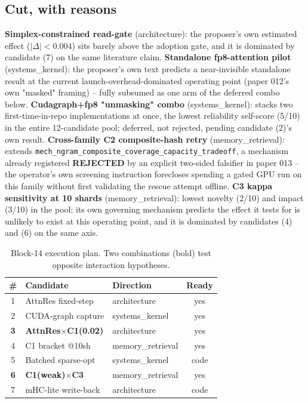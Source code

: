 \documentclass{article}
\begin{document}
\subsection{Cut, with reasons}
\textbf{Simplex-constrained read-gate} (architecture): the proposer's own estimated effect ($|\Delta|<0.004$) sits barely above the adoption gate, and it is dominated by candidate (7) on the same literature claim. \textbf{Standalone fp8-attention pilot} (systems\_kernel): the proposer's own text predicts a near-invisible standalone result at the current launch-overhead-dominated operating point (paper 012's own "masked" framing) -- fully subsumed as one arm of the deferred combo below. \textbf{Cudagraph+fp8 "unmasking" combo} (systems\_kernel): stacks two first-time-in-repo implementations at once, the lowest reliability self-score (5/10) in the entire 12-candidate pool; deferred, not rejected, pending candidate (2)'s own result. \textbf{Cross-family C2 composite-hash retry} (memory\_retrieval): extends \texttt{mech\_ngram\_composite\_coverage\_capacity\_tradeoff}, a mechanism already registered \textbf{REJECTED} by an explicit two-sided falsifier in paper 013 -- the operator's own screening instruction forecloses spending a gated GPU run on this family without first validating the rescue attempt offline. \textbf{C3 kappa sensitivity at 10 shards} (memory\_retrieval): lowest novelty (2/10) and impact (3/10) in the pool; its own governing mechanism predicts the effect it tests for is unlikely to exist at this operating point, and it is dominated by candidates (4) and (6) on the same axis.

\begin{table}[t]
\caption{Block-14 execution plan. Two combinations (bold) test opposite interaction hypotheses.}
\label{tab:plan}
\vskip 0.1in
\begin{center}\begin{small}\begin{tabular}{cllc}
\toprule
\# & Candidate & Direction & Ready \\
\midrule
1 & AttnRes fixed-step & architecture & yes \\
2 & CUDA-graph capture & systems\_kernel & yes \\
\textbf{3} & \textbf{AttnRes$\times$C1(0.02)} & architecture & yes \\
4 & C1 bracket @10sh & memory\_retrieval & yes \\
5 & Batched sparse-opt & systems\_kernel & code \\
\textbf{6} & \textbf{C1(weak)$\times$C3} & memory\_retrieval & yes \\
7 & mHC-lite write-back & architecture & code \\
\bottomrule
\end{tabular}\end{small}\end{center}
\vskip -0.15in
\end{table}
\end{document}
